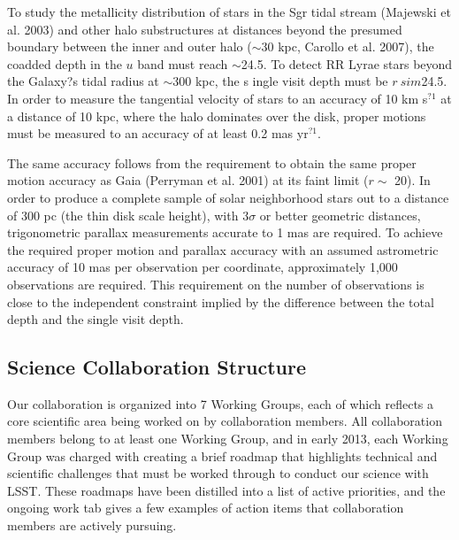 To study the metallicity distribution of stars in the Sgr tidal stream (Majewski et al. 2003)
and other halo substructures at distances beyond the presumed boundary between the inner
and outer halo ($\sim$30 kpc, Carollo et al. 2007), the coadded depth in the $u$ band must reach
$\sim$24.5. To detect RR Lyrae stars beyond the Galaxy?s tidal radius at $\sim$300 kpc, the s
ingle visit depth must be $r\ sim $24.5. In order to measure the tangential velocity of stars to an
accuracy of 10 km s$^{?1}$
at a distance of 10 kpc, where the halo dominates over the disk, proper
motions must be measured to an accuracy of at least 0.2 mas yr$^{?1}$.

The same accuracy follows
from the requirement to obtain the same proper motion accuracy as Gaia (Perryman et al.
2001) at its faint limit ($r \sim$ 20). In order to produce a complete sample of solar neighborhood
stars out to a distance of 300 pc (the thin disk scale height), with 3$\sigma$ or better geometric
distances, trigonometric parallax measurements accurate to 1 mas are required. To achieve
the required proper motion and parallax accuracy with an assumed astrometric accuracy of
10 mas per observation per coordinate, approximately 1,000 observations are required. This
requirement on the number of observations is close to the independent constraint implied by
the difference between the total depth and the single visit depth.



\subsection{Science Collaboration Structure}
 
Our collaboration is organized into 7 Working Groups, each of which reflects a core scientific area being worked on by collaboration members. All collaboration members belong to at least one Working Group, and in early 2013, each Working Group was charged with creating a brief roadmap that highlights technical and scientific challenges that must be worked through to conduct our science with LSST. These roadmaps have been distilled into a list of active priorities, and the ongoing work tab gives a few examples of action items that collaboration members are actively pursuing.


